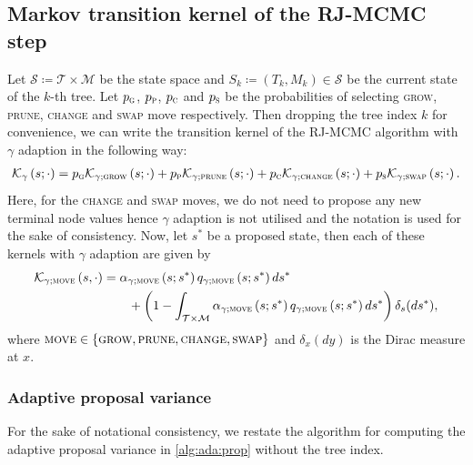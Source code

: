 \documentclass[
12pt]{article}
\begin{document}
\subsection{Markov transition kernel of the RJ-MCMC step}

Let $\mathcal{S}\coloneqq\mathcal{T}\times \mathcal{M}$ be the state space and $S_k\coloneqq(T_k,M_k) \in \mathcal{S}$ be the current state of the $k$-th tree. Let $p_{\textsc{g}}$, $p_{\textsc{p}}$, $p_{\textsc{c}}$ and $p_{\textsc{s}}$ be the probabilities of selecting \textsc{grow}, \textsc{prune}, \textsc{change} and \textsc{swap} move respectively. Then dropping the tree index $k$ for convenience, we can write the transition kernel of the RJ-MCMC algorithm with $\gamma$ adaption in the following way:
\begin{align*}
	\mathcal{K}_{\gamma}\left(s; \cdot\right) 
	= p_{\textsc{g}}\mathcal{K}_{\gamma;\textsc{grow}}\left(s; \cdot\right) + 
	p_{\textsc{p}}\mathcal{K}_{\gamma;\textsc{prune}}\left(s; \cdot\right) + 
	p_{\textsc{c}}\mathcal{K}_{\gamma;\textsc{change}}\left(s; \cdot\right)+ 
	p_{\textsc{s}}\mathcal{K}_{\gamma;\textsc{swap}}\left(s; \cdot\right).
\end{align*}
Here, for the \textsc{change} and \textsc{swap} moves, we do not need to propose any new terminal node values hence $\gamma$ adaption is not utilised and the notation is used for the sake of consistency. Now, let $s^{\ast}$ be a proposed state, then each of these kernels with $\gamma$ adaption are given by
\begin{align*}
	\mathcal{K}_{\gamma;\textsc{move}}\left(s, \cdot\right) 
	&= \alpha_{\gamma;\textsc{move}}\left(s;s^{\ast}\right) 
	q_{\gamma;\textsc{move}}\left(s;s^{\ast}\right)ds^{\ast} \\
	&\qquad+ \left(1 - \int_{\mathcal{T}\times\mathcal{M}} \alpha_{\gamma;\textsc{move}}\left(s;s^{\ast}\right) 
	q_{\gamma;\textsc{move}}\left(s;s^{\ast}\right)ds^{\ast}\right) \delta_{s}(ds^{\ast}),
\end{align*}
where $\textsc{move}\in \left\{\textsc{grow}, \textsc{prune}, \textsc{change}, \textsc{swap}\right\}$ and $\delta_x(dy)$ is the Dirac measure at $x$. 

\subsubsection{Adaptive proposal variance} 

For the sake of notational consistency, we restate the algorithm for computing the adaptive proposal variance in \cref{alg:ada:prop} without the tree index.
\end{document}
